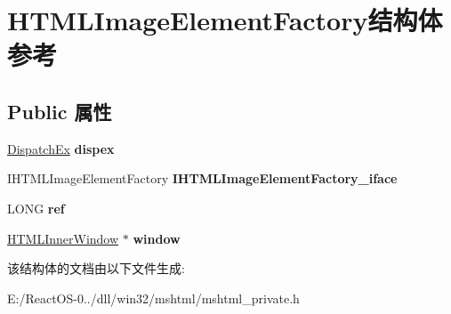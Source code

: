 \hypertarget{struct_h_t_m_l_image_element_factory}{}\section{H\+T\+M\+L\+Image\+Element\+Factory结构体 参考}
\label{struct_h_t_m_l_image_element_factory}
\subsection*{Public 属性}
\begin{DoxyCompactItemize}
\item 
\mbox{\label{struct_h_t_m_l_image_element_factory_a593855f3b134d81cd374d929ad52d916}} 
\hyperlink{struct_dispatch_ex}{Dispatch\+Ex} {\bfseries dispex}
\item 
\mbox{\label{struct_h_t_m_l_image_element_factory_ac9fcf5f65a01fd82c94442f78c63c70e}} 
I\+H\+T\+M\+L\+Image\+Element\+Factory {\bfseries I\+H\+T\+M\+L\+Image\+Element\+Factory\+\_\+iface}
\item 
\mbox{\label{struct_h_t_m_l_image_element_factory_afd63041cf840f6f0facbbf621d7a7bdf}} 
L\+O\+NG {\bfseries ref}
\item 
\mbox{\label{struct_h_t_m_l_image_element_factory_a984aff920b75b4b64ffbb0e311913b9c}} 
\hyperlink{struct_h_t_m_l_inner_window}{H\+T\+M\+L\+Inner\+Window} $\ast$ {\bfseries window}
\end{DoxyCompactItemize}


该结构体的文档由以下文件生成\+:\begin{DoxyCompactItemize}
\item 
E\+:/\+React\+O\+S-\/0../dll/win32/mshtml/mshtml\+\_\+private.\+h\end{DoxyCompactItemize}

